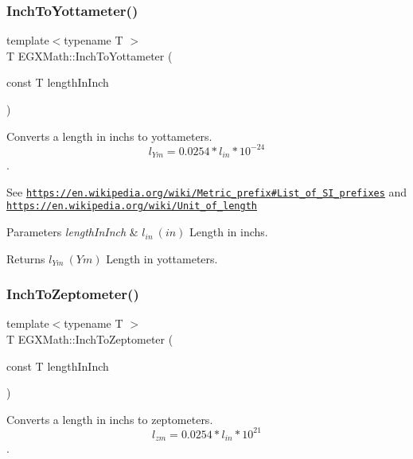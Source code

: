 \subsubsection{\texorpdfstring{Inch\+To\+Yottameter()}{InchToYottameter()}}
{\footnotesize\ttfamily template$<$typename T $>$ \\
T E\+G\+X\+Math\+::\+Inch\+To\+Yottameter (\begin{DoxyParamCaption}\item[{const T}]{length\+In\+Inch }\end{DoxyParamCaption})}



Converts a length in inchs to yottameters. \[ l_{Ym}=0.0254 * l_{in} * 10^{-24} \]. 

See \href{https://en.wikipedia.org/wiki/Metric_prefix#List_of_SI_prefixes}{\tt https\+://en.\+wikipedia.\+org/wiki/\+Metric\+\_\+prefix\#\+List\+\_\+of\+\_\+\+S\+I\+\_\+prefixes} and \href{https://en.wikipedia.org/wiki/Unit_of_length}{\tt https\+://en.\+wikipedia.\+org/wiki/\+Unit\+\_\+of\+\_\+length} 
\begin{DoxyParams}{Parameters}
{\em length\+In\+Inch} & $ l_{in}\ (in)$ Length in inchs. \\
\hline
\end{DoxyParams}
\begin{DoxyReturn}{Returns}
$ l_{Ym}\ (Ym)$ Length in yottameters. 
\end{DoxyReturn}
\mbox{\label{group___e_g_x_math-_conversions-_length_conversions-_imperial-_inch-_s_i_ga05a90a292ba82b7b777c90c95224c323}} 
\subsubsection{\texorpdfstring{Inch\+To\+Zeptometer()}{InchToZeptometer()}}
{\footnotesize\ttfamily template$<$typename T $>$ \\
T E\+G\+X\+Math\+::\+Inch\+To\+Zeptometer (\begin{DoxyParamCaption}\item[{const T}]{length\+In\+Inch }\end{DoxyParamCaption})}



Converts a length in inchs to zeptometers. \[ l_{zm}=0.0254 * l_{in} * 10^{21} \]. 

